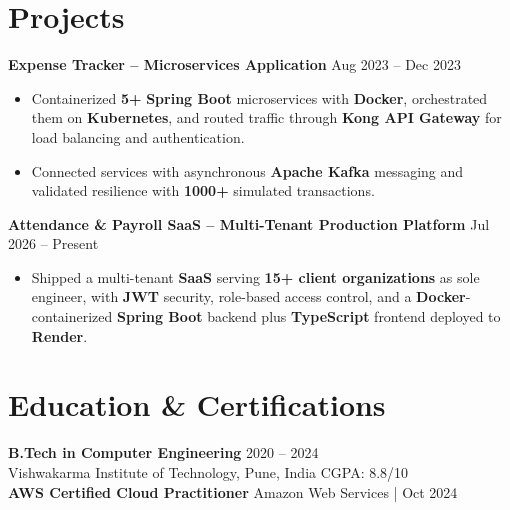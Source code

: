 \documentclass[a4paper,10pt]{article}
\begin{document}
\section*{Projects}

\textbf{Expense Tracker -- Microservices Application} \hfill Aug 2023 -- Dec 2023
\begin{itemize}[leftmargin=*]
    \item Containerized \textbf{5+} \textbf{Spring Boot} microservices with \textbf{Docker}, orchestrated them on \textbf{Kubernetes}, and routed traffic through \textbf{Kong API Gateway} for load balancing and authentication.
    \item Connected services with asynchronous \textbf{Apache Kafka} messaging and validated resilience with \textbf{1000+} simulated transactions.
\end{itemize}

\textbf{Attendance \& Payroll SaaS -- Multi-Tenant Production Platform} \hfill Jul 2026 -- Present
\begin{itemize}[leftmargin=*]
    \item Shipped a multi-tenant \textbf{SaaS} serving \textbf{15+ client organizations} as sole engineer, with \textbf{JWT} security, role-based access control, and a \textbf{Docker}-containerized \textbf{Spring Boot} backend plus \textbf{TypeScript} frontend deployed to \textbf{Render}.
\end{itemize}

\section*{Education \& Certifications}
\textbf{B.Tech in Computer Engineering} \hfill 2020 -- 2024 \\
Vishwakarma Institute of Technology, Pune, India \hfill CGPA: 8.8/10 \\
\textbf{AWS Certified Cloud Practitioner} \hfill Amazon Web Services \;|\; Oct 2024
\end{document}
